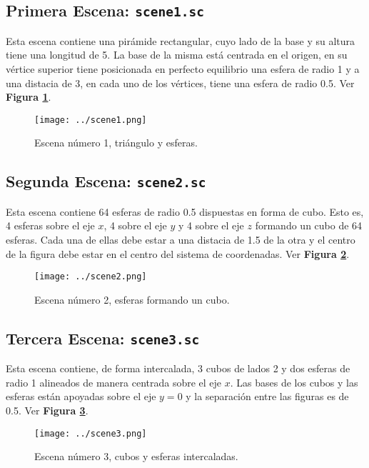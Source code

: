 \documentclass[a4paper,10pt]{article}
\begin{document}
\subsection{Primera Escena: \texttt{scene1.sc}}
Esta escena contiene una pir\'amide rectangular, cuyo lado de la base y su altura tiene una longitud de 5.  La base de la misma est\'a centrada en el origen, en su v\'ertice superior tiene posicionada en perfecto equilibrio una esfera de radio 1 y a una distacia de 3, en cada uno de los v\'ertices, tiene una esfera de radio 0.5. Ver \textbf{Figura \ref{fig:1}}.

\begin{figure}[h]
 \centering
 \texttt{[image: ../scene1.png]}
 \caption{Escena n\'umero 1, tri\'angulo y esferas.}
 \label{fig:1}
\end{figure}

\subsection{Segunda Escena: \texttt{scene2.sc}}
Esta escena contiene 64 esferas de radio 0.5 dispuestas en forma de cubo.  Esto es, 4 esferas sobre el eje $x$, 4 sobre el eje $y$ y 4 sobre el eje $z$ formando un cubo de 64 esferas. Cada una de ellas debe estar a una distacia de 1.5 de la otra y el centro de la figura debe estar en el centro del sistema de coordenadas. Ver \textbf{Figura \ref{fig:2}}.

\begin{figure}[h]
 \centering
 \texttt{[image: ../scene2.png]}
 \caption{Escena n\'umero 2, esferas formando un cubo.}
 \label{fig:2}
\end{figure}

\subsection{Tercera Escena: \texttt{scene3.sc}}
Esta escena contiene, de forma intercalada, 3 cubos de lados 2 y dos esferas de radio 1 alineados de manera centrada sobre el eje $x$.  Las bases de los cubos y las esferas est\'an apoyadas sobre el eje $y=0$ y la separaci\'on entre las figuras es de 0.5. Ver \textbf{Figura \ref{fig:3}}.

\begin{figure}[h]
 \centering
 \texttt{[image: ../scene3.png]}
 \caption{Escena n\'umero 3, cubos y esferas intercaladas.}
 \label{fig:3}
\end{figure}
\end{document}

